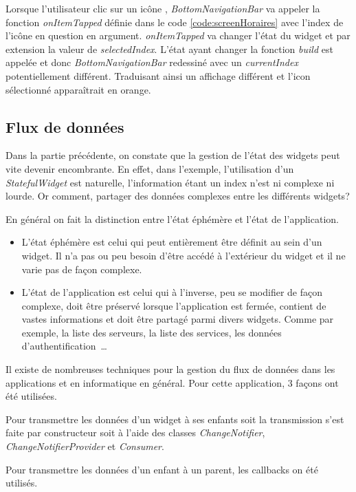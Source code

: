 Lorsque l'utilisateur clic sur un icône , \textit{BottomNavigationBar} va appeler la fonction \textit{onItemTapped} définie dans le code \ref{code:screenHoraires} avec
l'index de l'icône en question en argument. \textit{onItemTapped} va changer l'état du widget et par extension la valeur de \textit{selectedIndex}. L'état ayant changer la fonction
\textit{build} est appelée et donc \textit{BottomNavigationBar} redessiné avec un \textit{currentIndex} potentiellement différent. Traduisant ainsi
un affichage différent et l'icon sélectionné apparaîtrait en orange.

\subsection{Flux de données}
Dans la partie précédente, on constate que la gestion de l'état des widgets peut vite devenir encombrante. En effet, dans l'exemple,
l'utilisation d'un \textit{StatefulWidget} est naturelle, l'information étant un index n'est ni complexe ni lourde. Or comment, partager des
données complexes entre les différents widgets?

En général on fait la distinction entre l'état éphémère et l'état de l'application.
\smallskip
\begin{itemize}
    \item L'état éphémère est celui qui peut entièrement être définit au sein d'un widget. Il n'a pas ou peu besoin d'être
          accédé à l'extérieur du widget et il ne varie pas de façon complexe.
    \item L'état de l'application est celui qui à l'inverse, peu se modifier de façon complexe, doit être préservé lorsque l'application est fermée,
          contient de vastes informations et doit être partagé parmi divers widgets. Comme par exemple, la liste des serveurs, la liste des services, les
          données d'authentification~\dots
\end{itemize}

Il existe de nombreuses techniques pour la gestion du flux de données dans les applications et en informatique en général. Pour cette application, 3 façons
ont été utilisées.

Pour transmettre les données d'un widget à ses enfants soit la transmission s'est faite par constructeur soit à l'aide des classes \textit{ChangeNotifier}, \textit{ChangeNotifierProvider} et \textit{Consumer}.

Pour transmettre les données d'un enfant à un parent, les callbacks on été utilisés.

